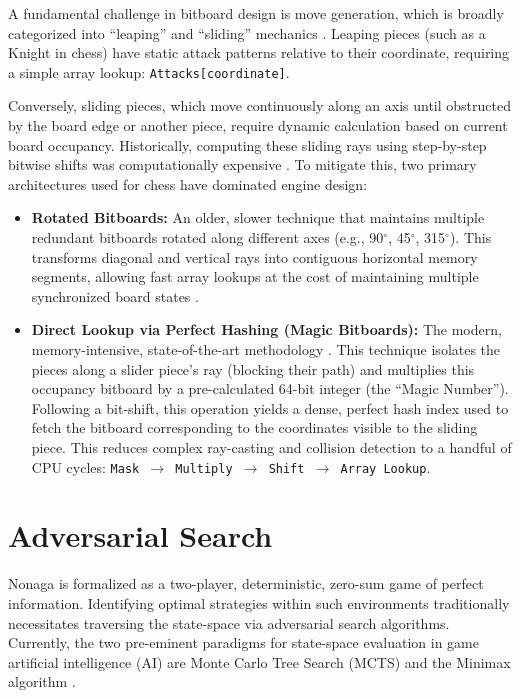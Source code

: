 A fundamental challenge in bitboard design is move generation, which is broadly categorized into ``leaping'' and ``sliding'' mechanics \cite{browne2014bitboards}. Leaping pieces (such as a Knight in chess) have static attack patterns relative to their coordinate, requiring a simple array lookup: \texttt{Attacks[coordinate]}.

Conversely, sliding pieces, which move continuously along an axis until obstructed by the board edge or another piece, require dynamic calculation based on current board occupancy. Historically, computing these sliding rays using step-by-step bitwise shifts was computationally expensive \cite{hyatt1999rotated}. To mitigate this, two primary architectures used for chess have dominated engine design:

\begin{itemize}

  \item \textbf{Rotated Bitboards:} An older, slower technique that maintains multiple redundant bitboards rotated along different axes (e.g., 90$^{\circ}$, 45$^{\circ}$, 315$^{\circ}$). This transforms diagonal and vertical rays into contiguous horizontal memory segments, allowing fast array lookups at the cost of maintaining multiple synchronized board states \cite{hyatt1999rotated}.

  \item \textbf{Direct Lookup via Perfect Hashing (Magic Bitboards):} The modern, memory-intensive, state-of-the-art methodology \cite{tannous2007avoiding}. This technique isolates the pieces along a slider piece's ray (blocking their path) and multiplies this occupancy bitboard by a pre-calculated 64-bit integer (the ``Magic Number''). Following a bit-shift, this operation yields a dense, perfect hash index used to fetch the bitboard corresponding to the coordinates visible to the sliding piece. This reduces complex ray-casting and collision detection to a handful of CPU cycles: \texttt{Mask $\rightarrow$ Multiply $\rightarrow$ Shift $\rightarrow$ Array Lookup}.

\end{itemize}


\section{Adversarial Search}
Nonaga is formalized as a two-player, deterministic, zero-sum game of perfect information. Identifying optimal strategies within such environments traditionally necessitates traversing the state-space via adversarial search algorithms. Currently, the two pre-eminent paradigms for state-space evaluation in game artificial intelligence (AI) are Monte Carlo Tree Search (MCTS) and the Minimax algorithm \cite{SA2020survey}.

